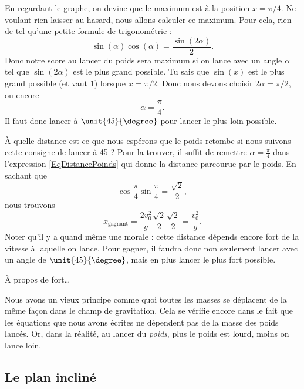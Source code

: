 En regardant le graphe, on devine que le maximum est à la position $x=\pi/4$. Ne voulant rien laisser au hasard, nous allons calculer ce maximum. Pour cela, rien de tel qu'une petite formule de trigonométrie :
\begin{equation}
	\sin(\alpha)\cos(\alpha)=\frac{ \sin(2\alpha) }{2}.
\end{equation}
Donc notre score au lancer du poids sera maximum si on lance avec un angle $\alpha$ tel que $\sin(2\alpha)$ est le plus grand possible. Tu sais que $\sin(x)$ est le plus grand possible (et vaut $1$) lorsque $x=\pi/2$. Donc nous devons choisir $2\alpha=\pi/2$, ou encore
\begin{equation}
	\alpha=\frac{ \pi }{ 4 }.
\end{equation}
Il faut donc lancer à $\unit{45}{\degree}$ pour lancer le plus loin possible.

À quelle distance est-ce que nous espérons que le poids retombe si nous suivons cette consigne de lancer à \unit{45}{\degree} ? Pour la trouver, il suffit de remettre $\alpha=\frac{ \pi }{ 4 }$ dans l'expression \eqref{EqDistancePoinds} qui donne la distance parcourue par le poids. En sachant que
\begin{equation}
	\cos\frac{ \pi }{ 4 }\sin\frac{ \pi }{ 4 }=\frac{ \sqrt{2} }{2},
\end{equation}
nous trouvons
\begin{equation}
	x_{\text{gagnant}}=\frac{ 2v_0^2 }{ g }\frac{ \sqrt{2} }{2}\frac{ \sqrt{2} }{2}=\frac{ v_0^2 }{ g }.
\end{equation}
Noter qu'il y a quand même une morale : cette distance dépends encore fort de la vitesse à laquelle on lance. Pour gagner, il faudra donc non seulement lancer avec un  angle de $\unit{45}{\degree}$, mais en plus lancer le plus fort possible.

À propos de \og fort\fg\ldots

\begin{probleme}
	Nous avons un vieux principe comme quoi toutes les masses se déplacent de la même façon dans le champ de gravitation. Cela se vérifie encore dans le fait que les équations que nous avons écrites ne dépendent pas de la masse des poids lancés.  Or, dans la réalité, au lancer du \emph{poids}, plus le poids est lourd, moins on lance loin. 
\end{probleme}

\subsection{Le plan incliné}

